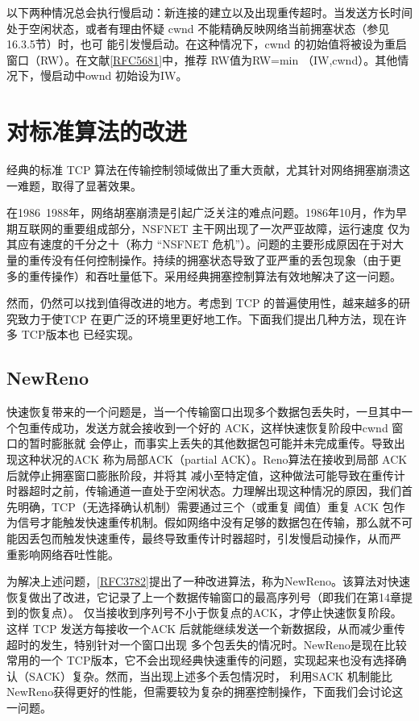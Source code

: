 以下两种情况总会执行慢启动：新连接的建立以及出现重传超时。当发送方长时间处于空闲状态，或者有理由怀疑 cwnd 不能精确反映网络当前拥塞状态（参见16.3.5节）时，也可
能引发慢启动。在这种情况下，cwnd 的初始值将被设为重启窗口（RW）。在文献\href{https://www.rfc-editor.org/rfc/rfc5681}{[RFC5681]}中，推荐 RW值为RW=min （IW,cwnd）。其他情况下，慢启动中ownd 初始设为IW。

\section{对标准算法的改进}
经典的标准 TCP 算法在传输控制领域做出了重大贡献，尤其针对网络拥塞崩溃这一难题，取得了显著效果。

\begin{tcolorbox}
    在1986~1988年，网络胡塞崩溃是引起广泛关注的难点问题。1986年10月，作为早期互联网的重要组成部分，NSFNET 主干网出现了一次严亚故障，运行速度
    仅为其应有速度的千分之十（称力 “NSFNET 危机”）。问题的主要形成原因在于对大量的重传没有任何控制操作。持续的拥塞状态导致了亚严重的丢包现象（由于更
    多的重传操作）和吞吐量低下。采用经典拥塞控制算法有效地解决了这一问题。
\end{tcolorbox}

然而，仍然可以找到值得改进的地方。考虑到 TCP 的普遍使用性，越来越多的研究致力于使TCP 在更广泛的环境里更好地工作。下面我们提出几种方法，现在许多 TCP版本也
已经实现。

\subsection{NewReno}
快速恢复带来的一个问题是，当一个传输窗口出现多个数据包丢失时，一旦其中一个包重传成功，发送方就会接收到一个好的 ACK，这样快速恢复阶段中cwnd 窗口的暂时膨胀就
会停止，而事实上丢失的其他数据包可能并未完成重传。导致出现这种状况的ACK 称为局部ACK（partial ACK）。Reno算法在接收到局部 ACK 后就停止拥塞窗口膨胀阶段，并将其
减小至特定值，这种做法可能导致在重传计时器超时之前，传输通道一直处于空闲状态。力理解出现这种情况的原因，我们首先明确，TCP（无选择确认机制）需要通过三个（或重复
阈值）重复 ACK 包作为信号才能触发快速重传机制。假如网络中没有足够的数据包在传输，那么就不可能因丢包而触发快速重传，最终导致重传计时器超时，引发慢启动操作，从而严
重影响网络吞吐性能。

为解决上述问题，\href{https://www.rfc-editor.org/rfc/rfc3782}{[RFC3782]}提出了一种改进算法，称为NewReno。该算法对快速恢复做出了改进，它记录了上一个数据传输窗口的最高序列号（即我们在第14章提到的恢复点）。
仅当接收到序列号不小于恢复点的ACK，才停止快速恢复阶段。这样 TCP 发送方每接收一个ACK 后就能继续发送一个新数据段，从而减少重传超时的发生，特别针对一个窗口出现
多个包丢失的情况时。NewReno是现在比较常用的一个 TCP版本，它不会出现经典快速重传的问题，实现起来也没有选择确认（SACK）复杂。然而，当出现上述多个丢包情况时，
利用SACK 机制能比 NewReno获得更好的性能，但需要较为复杂的拥塞控制操作，下面我们会讨论这一问题。


